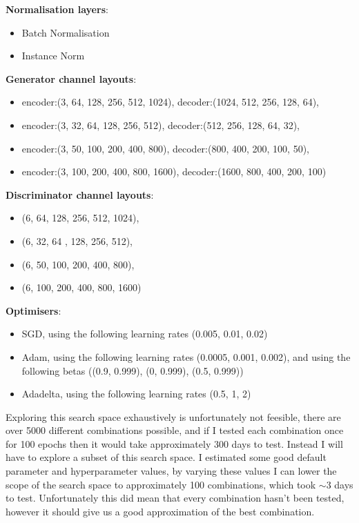 \documentclass{UoYCSproject}
\begin{document}
\textbf{Normalisation layers}: 
\begin{itemize}
\item Batch Normalisation
\item Instance Norm
\end{itemize}
\textbf{Generator channel layouts}:
\begin{itemize}
\item encoder:(3, 64, 128, 256, 512, 1024), decoder:(1024, 512, 256, 128, 64),
\item encoder:(3, 32, 64, 128, 256, 512), decoder:(512, 256, 128, 64, 32),
\item encoder:(3, 50, 100, 200, 400, 800), decoder:(800, 400, 200, 100, 50),
\item encoder:(3, 100, 200, 400, 800, 1600), decoder:(1600, 800, 400, 200, 100)
\end{itemize}
\textbf{Discriminator channel layouts}:
\begin{itemize}
\item (6, 64, 128, 256, 512, 1024),
\item (6, 32, 64 , 128, 256, 512),
\item (6, 50, 100, 200, 400, 800),
\item (6, 100, 200, 400, 800, 1600)
\end{itemize}
\textbf{Optimisers}:
\begin{itemize}
\item SGD, using the following learning rates (0.005, 0.01, 0.02)
\item Adam, using the following learning rates (0.0005, 0.001, 0.002), and using the following betas ((0.9, 0.999), (0, 0.999), (0.5, 0.999))
\item Adadelta, using the following learning rates (0.5, 1, 2)
\end{itemize}
Exploring this search space exhaustively is unfortunately not feesible, there are over 5000 different combinations possible, and if I tested each combination once for 100 epochs then it would take approximately 300 days to test.
Instead I will have to explore a subset of this search space. I estimated some good default parameter and hyperparameter values, by varying these values I can lower the scope of the search space to 
approximately 100 combinations, which took \(\sim\)3 days to test. Unfortunately this did mean that every combination hasn't been tested, however it should give us a good approximation of the best combination.
\end{document}
